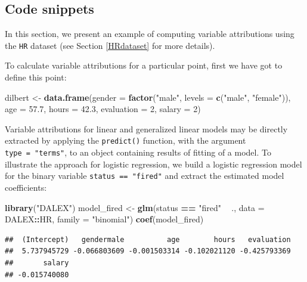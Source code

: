 \documentclass[12pt,]{krantz}
\newenvironment{Shaded}{\begin{snugshade}}{\end{snugshade}}
\newcommand{\DataTypeTok}[1]{\textcolor[rgb]{0.13,0.29,0.53}{#1}}
\newcommand{\DecValTok}[1]{\textcolor[rgb]{0.00,0.00,0.81}{#1}}
\newcommand{\FloatTok}[1]{\textcolor[rgb]{0.00,0.00,0.81}{#1}}
\newcommand{\KeywordTok}[1]{\textcolor[rgb]{0.13,0.29,0.53}{\textbf{#1}}}
\newcommand{\NormalTok}[1]{#1}
\newcommand{\OperatorTok}[1]{\textcolor[rgb]{0.81,0.36,0.00}{\textbf{#1}}}
\newcommand{\StringTok}[1]{\textcolor[rgb]{0.31,0.60,0.02}{#1}}
\theoremstyle{definition}
\theoremstyle{definition}
\theoremstyle{definition}
\theoremstyle{remark}
\begin{document}
\hypertarget{code-snippets-3}{%
\subsection{Code snippets}\label{code-snippets-3}}

In this section, we present an example of computing variable
attributions using the \texttt{HR} dataset (see Section \ref{HRdataset}
for more details).

To calculate variable attributions for a particular point, first we have
got to define this point:

\begin{Shaded}
\begin{Highlighting}[]
\NormalTok{dilbert <-}\StringTok{ }\KeywordTok{data.frame}\NormalTok{(}\DataTypeTok{gender =} \KeywordTok{factor}\NormalTok{(}\StringTok{"male"}\NormalTok{, }\DataTypeTok{levels =} \KeywordTok{c}\NormalTok{(}\StringTok{"male"}\NormalTok{, }\StringTok{"female"}\NormalTok{)),}
                \DataTypeTok{age =} \FloatTok{57.7}\NormalTok{,}
                \DataTypeTok{hours =} \FloatTok{42.3}\NormalTok{,}
                \DataTypeTok{evaluation =} \DecValTok{2}\NormalTok{,}
                \DataTypeTok{salary =} \DecValTok{2}\NormalTok{)}
\end{Highlighting}
\end{Shaded}

Variable attributions for linear and generalized linear models may be
directly extracted by applying the \texttt{predict()} function, with the
argument \texttt{type\ =\ "terms"}, to an object containing results of
fitting of a model. To illustrate the approach for logistic regression,
we build a logistic regression model for the binary variable
\texttt{status\ ==\ "fired"} and extract the estimated model
coefficients:

\begin{Shaded}
\begin{Highlighting}[]
\KeywordTok{library}\NormalTok{(}\StringTok{"DALEX"}\NormalTok{)}
\NormalTok{model_fired <-}\StringTok{ }\KeywordTok{glm}\NormalTok{(status }\OperatorTok{==}\StringTok{ "fired"} \OperatorTok{~}\StringTok{ }\NormalTok{., }\DataTypeTok{data =}\NormalTok{ DALEX}\OperatorTok{::}\NormalTok{HR, }\DataTypeTok{family =} \StringTok{"binomial"}\NormalTok{)}
\KeywordTok{coef}\NormalTok{(model_fired)}
\end{Highlighting}
\end{Shaded}

\begin{verbatim}
##  (Intercept)   gendermale          age        hours   evaluation 
##  5.737945729 -0.066803609 -0.001503314 -0.102021120 -0.425793369 
##       salary 
## -0.015740080
\end{verbatim}
\end{document}
